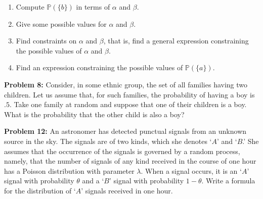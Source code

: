 \documentclass[12pt]{article}
\begin{document}
\begin{enumerate}[label=(\roman*)]
\item Compute $\mathbb{P}(\{ b \})$ in terms of $\alpha$ and $\beta$.
\item Give some possible values for $\alpha$ and $\beta$.
\item Find constraints on $\alpha$ and $\beta$, that is, find a general expression constraining the possible values of $\alpha$ and $\beta$.
\item Find an expression constraining the possible values of $\mathbb{P}(\{ a \})$.
\end{enumerate}

\vspace*{5cm}

\noindent
\textbf{Problem 8:} Consider, in some ethnic group, the set of all families having two children. Let us assume that, for such families, the probability of having a boy is $.5$. Take one family at random and suppose that one of their children is a boy. What is the probability that the other child is also a boy?

\vspace*{5cm}

\noindent
\textbf{Problem 12:} An astronomer has detected punctual signals from an unknown source in the sky. The signals are of two kinds, which she denotes `$A$' and `$B$.' She assumes that the occurrence of the signals is governed by a random process, namely, that the number of signals of any kind received in the course of one hour has a Poisson distribution with parameter $\lambda$. When a signal occurs, it is an `$A$' signal with probability $\theta$ and a `$B$' signal with probability $1-\theta$. Write a formula for the distribution of `$A$'  signals received in one hour.

\vspace*{5cm}
\end{document}
